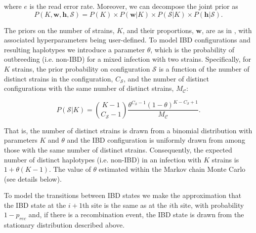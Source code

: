 \documentclass[9pt]{article}
\begin{document}
\noindent where $e$ is the read error rate.  Moreover, we can decompose the joint prior as
\begin{equation}
P(K, \mathbf{w}, \mathbf{h}, \mathcal{S}) = P(K) \times P(\mathbf{w}|K) \times P(\mathcal{S}|K) \times P(\mathbf{h}|\mathcal{S}).
\end{equation}

\noindent The priors on the number of strains, $K$, and their proportions, $\mathbf{w}$, are as in \citet{Zhu2017}, with associated hyperparameters being user-defined.  To model IBD configurations and resulting haplotypes we introduce a parameter $\theta$, which is the probability of outbreeding (i.e. non-IBD) for a mixed infection with two strains.  Specifically, for $K$ strains, the prior probability on configuration $\mathcal{S}$ is a function of the number of distinct strains in the configuration, $C_{\mathcal{S}}$, and the number of distinct configurations with the same number of distinct strains, $M_{\mathcal{C}}$:

\begin{equation}
    P(\mathcal{S}|K) = \genfrac{(}{)}{0pt}{}{K-1}{C_{\mathcal{S}}-1} \frac{\theta^{C_{\mathcal{S}}-1}(1-\theta)^{K-C_{\mathcal{S}}+1}}{M_{\mathcal{C}}}.
\end{equation}

\noindent That is, the number of distinct strains is drawn from a binomial distribution with parameters $K$ and $\theta$ and the IBD configuration is uniformly drawn from among those with the same number of distinct strains.  Consequently, the expected number of distinct haplotypes (i.e. non-IBD) in an infection with $K$ strains is $1+\theta (K-1)$. The value of $\theta$ estimated within the Markov chain Monte Carlo (see details below).


To model the transitions between IBD states we make the approximation that the IBD state at the $i+1$th site is the same as at the $i$th site, with probability $1-p_{rec}$ and, if there is a recombination event, the IBD state is drawn from the stationary distribution described above.
\end{document}
